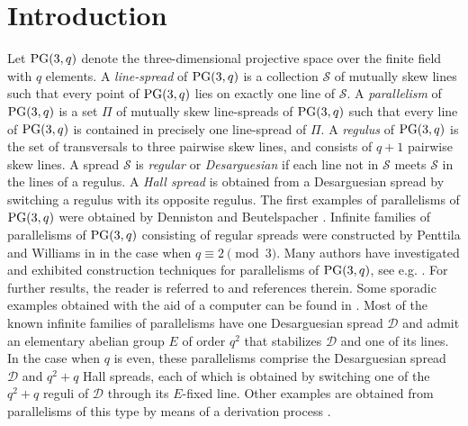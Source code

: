 \documentclass[11pt]{article}
\theoremstyle{definition}
\numberwithin{equation}{section}
\def\cD{\mathcal D}
\def\cS{\mathcal S}
\def\PG{{\rm PG}}
\begin{document}
\section{Introduction}

Let $\PG(3, q)$ denote the three-dimensional projective space over the finite field with $q$ elements. A {\em line-spread} of $\PG(3, q)$ is a collection $\cS$ of mutually skew lines such that every point of $\PG(3, q)$ lies on exactly one line of $\cS$. A {\em parallelism} of $\PG(3, q)$ is a set $\Pi$ of mutually skew line-spreads of $\PG(3, q)$ such that every line of $\PG(3, q)$ is contained in precisely one line-spread of $\Pi$. A {\em regulus} of $\PG(3,q)$ is the set of transversals to three pairwise skew lines, and consists of $q +1$ pairwise skew lines. A spread $\cS$ is {\em regular} or {\em Desarguesian} if each line not in $\cS$ meets $\cS$ in the lines of a regulus. A {\em Hall spread} is obtained from a Desarguesian spread by switching a regulus with its opposite  regulus. The first examples of parallelisms of $\PG(3, q)$ were obtained by Denniston \cite{D1972} and Beutelspacher \cite{beutelspacher1974parallelisms}. Infinite families of parallelisms of $\PG(3, q)$ consisting of regular spreads were constructed by Penttila and Williams in \cite{PW1998} in the case when $q \equiv 2 \pmod{3}$. Many authors have investigated and exhibited construction techniques for parallelisms of $\PG(3, q)$, see e.g. \cite{J2000, J2003, J2008}. For further results, the reader is referred to \cite{J2010} and references therein. Some sporadic examples obtained with the aid of a computer can be found in \cite{Prince1998, Betten, Topalova}. Most of the known infinite families of parallelisms have one Desarguesian spread $\cD$ and admit an elementary abelian group $E$ of order $q^2$ that stabilizes $\cD$ and one of its lines. In the case when $q$ is even, these parallelisms comprise the Desarguesian spread $\cD$ and $q^2+q$ Hall spreads, each of which is obtained by switching one of the $q^2+q$ reguli of $\cD$ through its $E$-fixed line. Other examples are obtained from parallelisms of this type by means of a derivation process \cite[Theorem 175]{J2010}.  
\end{document}
